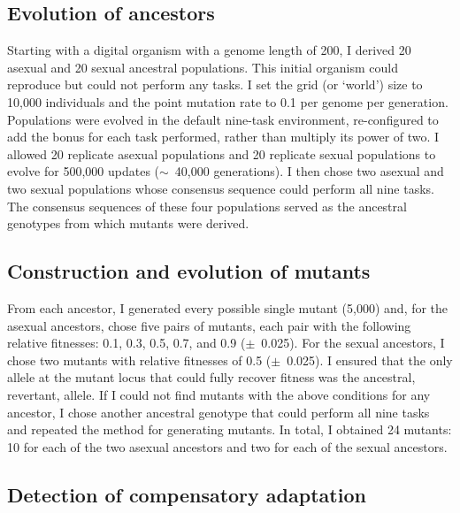 \begin{doublespace}
\subsection{Evolution of ancestors}

Starting with a digital organism with a genome length of 200,
I derived 20 asexual and 20 sexual ancestral populations.
%
This initial organism could reproduce but could not perform any tasks.
%
I set the grid (or `world') size to 10,000 individuals
and the point mutation rate to 0.1 per genome per generation.
%
Populations were evolved in the default nine-task environment,
re-configured to add the bonus for each task performed,
rather than multiply its power of two.
%
I allowed 20 replicate asexual populations
and 20 replicate sexual populations
to evolve for 500,000 updates ($\sim$~40,000 generations).
%
I then chose two asexual and two sexual populations
whose consensus sequence could perform all nine tasks.
%
The consensus sequences of these four populations
served as the ancestral genotypes from which mutants were derived.


\subsection{Construction and evolution of mutants}

From each ancestor, I generated every possible single mutant (5,000)
and, for the asexual ancestors, chose five pairs of mutants,
each pair with the following relative fitnesses:
0.1, 0.3, 0.5, 0.7, and 0.9 ($\pm$~0.025).
%
For the sexual ancestors, I chose two mutants
with relative fitnesses of 0.5 ($\pm$~0.025).
%
I ensured that the only allele at the mutant locus
that could fully recover fitness was the ancestral, revertant, allele.
%
If I could not find mutants with the above conditions for any ancestor,
I chose another ancestral genotype that could perform all nine tasks
and repeated the method for generating mutants.
%
In total, I obtained 24 mutants: 10 for each of the two asexual ancestors
and two for each of the sexual ancestors.


\subsection{Detection of compensatory adaptation}


\end{doublespace}
